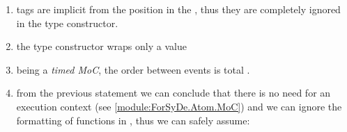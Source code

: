                  \begin{enumerate}
                 \item 
                 tags are implicit from the position in the
 , thus they are completely
 ignored in the type constructor.\par
                 
                 \item 
                 the type constructor wraps only a value\par
                 
                 \item 
                 being a \emph{timed MoC}, the order between events is total
 \cite{Lee98}.\par
                 
                 \item 
                 from the previous statement we can conclude that there is no
 need for an execution context (see \cref{module:ForSyDe.Atom.MoC})
 and we can ignore the formatting of functions in
 , thus we can safely assume:
 \par
                 
                 \end{enumerate}
                 
